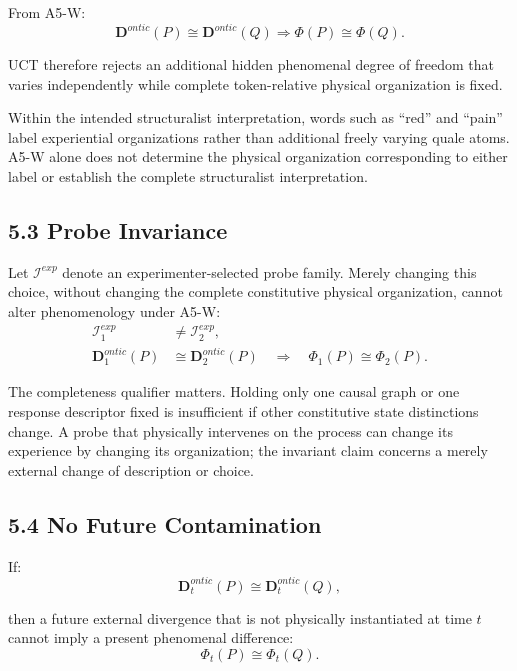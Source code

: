 \documentclass[
  11pt,
  a4paper,
]{article}
\begin{document}
From A5-W:
\nopagebreak[4]
\[
\mathbf D^{ontic}(P)\cong
\mathbf D^{ontic}(Q)
\Rightarrow
\Phi(P)\cong
\Phi(Q).
\]

UCT therefore rejects an additional hidden phenomenal degree of freedom
that varies independently while complete token-relative physical
organization is fixed.

Within the intended structuralist interpretation, words such as ``red''
and ``pain'' label experiential organizations rather than additional
freely varying quale atoms. A5-W alone does not determine the physical
organization corresponding to either label or establish the complete
structuralist interpretation.

\hypertarget{probe-invariance}{%
\subsection{5.3 Probe Invariance}\label{probe-invariance}}

Let \(\mathcal I^{exp}\) denote an experimenter-selected probe family.
Merely changing this choice, without changing the complete constitutive
physical organization, cannot alter phenomenology under A5-W:
\nopagebreak[4]
\[
\begin{aligned}
\mathcal I^{exp}_1&\ne\mathcal I^{exp}_2,\\
\mathbf D^{ontic}_1(P)&\cong\mathbf D^{ontic}_2(P)
\quad\Longrightarrow\quad \Phi_1(P)\cong\Phi_2(P).
\end{aligned}
\]

The completeness qualifier matters. Holding only one causal graph or one
response descriptor fixed is insufficient if other constitutive state
distinctions change. A probe that physically intervenes on the process
can change its experience by changing its organization; the invariant
claim concerns a merely external change of description or choice.

\hypertarget{no-future-contamination}{%
\subsection{5.4 No Future Contamination}\label{no-future-contamination}}

If:
\nopagebreak[4]
\[
\mathbf D^{ontic}_t(P)
\cong
\mathbf D^{ontic}_t(Q),
\]

then a future external divergence that is not physically instantiated at
time \(t\) cannot imply a present phenomenal difference:
\nopagebreak[4]
\[
\boxed{
\Phi_t(P)\cong\Phi_t(Q).
}
\]
\end{document}
